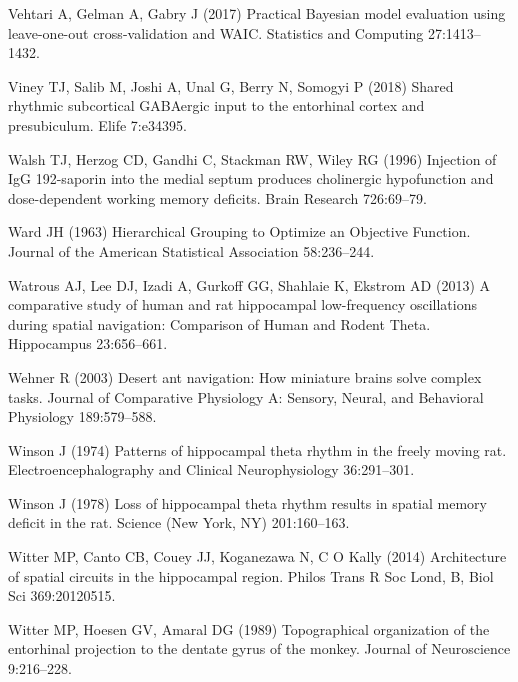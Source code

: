 \documentclass[
  12pt,
  a4paper,
  openany]{book}
\newlength{\cslhangindent}
\newlength{\cslentryspacingunit} %
\newenvironment{CSLReferences}[2] %
 {%
  \setlength{\parindent}{0pt}
  \ifodd #1
  \let\oldpar\par
  \def\par{\hangindent=\cslhangindent\oldpar}
  \fi
  \setlength{\parskip}{#2\cslentryspacingunit}
 }%
 {}
\begin{document}
\begin{CSLReferences}{1}{0}
\leavevmode{}%
Vehtari A, Gelman A, Gabry J (2017) Practical {Bayesian} model evaluation using leave-one-out cross-validation and {WAIC}. Statistics and Computing 27:1413--1432.

\leavevmode{}%
Viney TJ, Salib M, Joshi A, Unal G, Berry N, Somogyi P (2018) Shared rhythmic subcortical {GABAergic} input to the entorhinal cortex and presubiculum. Elife 7:e34395.

\leavevmode{}%
Walsh TJ, Herzog CD, Gandhi C, Stackman RW, Wiley RG (1996) Injection of {IgG} 192-saporin into the medial septum produces cholinergic hypofunction and dose-dependent working memory deficits. Brain Research 726:69--79.

\leavevmode{}%
Ward JH (1963) Hierarchical {Grouping} to {Optimize} an {Objective} {Function}. Journal of the American Statistical Association 58:236--244.

\leavevmode{}%
Watrous AJ, Lee DJ, Izadi A, Gurkoff GG, Shahlaie K, Ekstrom AD (2013) A comparative study of human and rat hippocampal low-frequency oscillations during spatial navigation: {Comparison} of {Human} and {Rodent} {Theta}. Hippocampus 23:656--661.

\leavevmode{}%
Wehner R (2003) Desert ant navigation: How miniature brains solve complex tasks. Journal of Comparative Physiology A: Sensory, Neural, and Behavioral Physiology 189:579--588.

\leavevmode{}%
Winson J (1974) Patterns of hippocampal theta rhythm in the freely moving rat. Electroencephalography and Clinical Neurophysiology 36:291--301.

\leavevmode{}%
Winson J (1978) Loss of hippocampal theta rhythm results in spatial memory deficit in the rat. Science (New York, NY) 201:160--163.

\leavevmode{}%
Witter MP, Canto CB, Couey JJ, Koganezawa N, C O Kally (2014) Architecture of spatial circuits in the hippocampal region. Philos Trans R Soc Lond, B, Biol Sci 369:20120515.

\leavevmode{}%
Witter MP, Hoesen GV, Amaral DG (1989) Topographical organization of the entorhinal projection to the dentate gyrus of the monkey. Journal of Neuroscience 9:216--228.


\end{CSLReferences}
\end{document}
